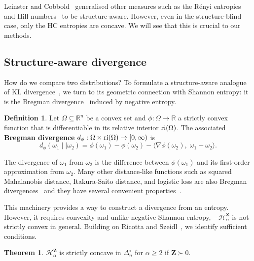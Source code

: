 \documentclass[aps,pre,floats,floatfix,superscriptaddress,twocolumn,final,10pt]{revtex4-2}
\theoremstyle{definition}
\newtheorem{definition}{Definition}
\newtheorem{theorem}{Theorem}
\renewcommand{\vec}[1]{\mathbf{#1}}
\newcommand{\entropyname}[2]{\mathcal{H}^{#1}_{#2}}
\begin{document}
Leinster and Cobbold~\cite{Leinster2012} generalised other measures such as the R\'enyi entropies~\cite{Renyi1961} and Hill numbers~\cite{Hill1973} to be structure-aware. However, even in the structure-blind case, only the HC entropies are concave. We will see that this is crucial to our methods.


\subsection{Structure-aware divergence}
How do we compare two distributions? To formulate a structure-aware analogue of KL divergence~\cite{Kullback1951}, we turn to its geometric connection with Shannon entropy: it is the Bregman divergence~\cite{Bregman1967} induced by negative entropy.

\begin{definition}
    Let $\Omega \subseteq \mathbb{R}^n$ be a convex set and $\phi:\Omega \to \mathbb{R}$ a strictly convex function that is differentiable in its relative interior $\textnormal{ri}(\Omega)$. The associated \textbf{Bregman divergence} $d_\phi:\Omega \times \textnormal{ri}(\Omega) \to [0, \infty)$ is
    \begin{equation}
        d_\phi\left( \omega_1 \mid\mid\omega_2 \right) = \phi(\omega_1) - \phi(\omega_2) - \langle \nabla \phi(\omega_2) ,\; \omega_1 - \omega_2 \rangle.
    \end{equation}
\label{def:bregman_divergence}
\end{definition}

The divergence of $\omega_1$ from $\omega_2$ is the difference between $\phi(\omega_1)$ and its first-order approximation from $\omega_2$. Many other distance-like functions such as squared Mahalanobis distance, Itakura-Saito distance, and logistic loss are also Bregman divergences~\cite[Table 1]{Banerjee2004} and they have several convenient properties~\cite[Appendix A]{Banerjee2004}.

This machinery provides a way to construct a divergence from an entropy. However, it requires convexity and unlike negative Shannon entropy, $-\entropyname{\vec{Z}}{\alpha}$ is not strictly convex in general. Building on Ricotta and Szeidl~\cite{Ricotta2006}, we identify sufficient conditions.

\begin{theorem}
    $\entropyname{\vec{Z}}{\alpha}$ is strictly concave in $\Delta_n^\circ$ for $\alpha \geq 2$ if $\vec{Z} \succ 0$.
\label{thm:concavity}
\end{theorem}
\end{document}
